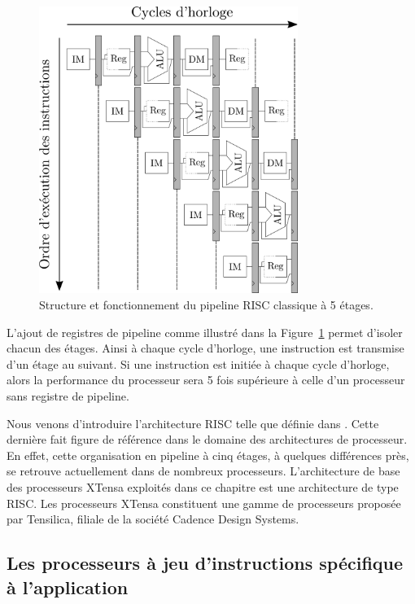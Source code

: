 \begin{figure}[t]
\centering
\includegraphics[width=0.75\textwidth]{main/ch3_fig/pipelines}
\caption{Structure et fonctionnement du pipeline RISC classique à 5 étages.}
\label{fig:pipelines}
\end{figure}


L'ajout de registres de pipeline comme illustré dans la Figure~\ref{fig:pipelines} permet d'isoler chacun des étages. Ainsi à chaque cycle d'horloge, une instruction est transmise d'un étage au suivant. Si une instruction est initiée à chaque cycle d'horloge, alors la performance du processeur sera 5 fois supérieure à celle d'un processeur sans registre de pipeline.

Nous venons d'introduire l'architecture RISC telle que définie dans \cite{hennessy2011computer}. Cette dernière fait figure de référence dans le domaine des architectures de processeur. En effet, cette organisation en pipeline à cinq étages, à quelques différences près, se retrouve actuellement dans de nombreux processeurs. L'architecture de base des processeurs XTensa exploités dans ce chapitre est une architecture de type RISC. Les processeurs XTensa constituent une gamme de processeurs proposée par Tensilica, filiale de la société Cadence Design Systems.

\subsection{Les processeurs à jeu d'instructions spécifique à l'application}

